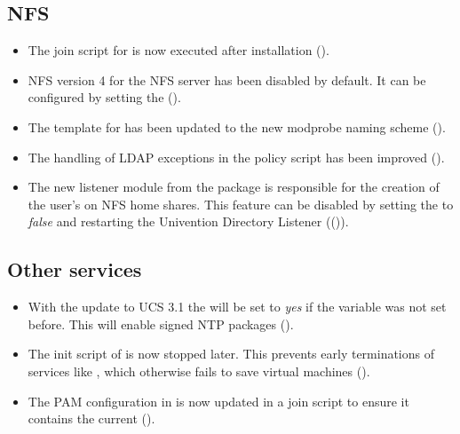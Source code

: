 \subsection{NFS}
\begin{itemize}
\item The join script for  is now
  executed after installation ().

\item NFS version 4 for the NFS server has been disabled by
  default. It can be configured by setting the
   ().

\item The \ucsUCR{} template for
   has been updated to the
  new modprobe naming scheme ().

\item The handling of LDAP exceptions in the policy script
   has been improved ().

\item The new listener module  from the package
   is responsible for the creation of
  the user's  on NFS home shares. This feature can be
  disabled by setting the  to
  \emph{false} and restarting the Univention Directory Listener
  (()).
\end{itemize}


\subsection{Other services}
\begin{itemize}
\item With the update to UCS 3.1 the  will be set
  to \emph{yes} if the variable was not set before. This will enable signed
  NTP packages ().

\item The init script of  is now stopped later. This
  prevents early terminations of services like ,
  which otherwise fails to save virtual machines ().

\item The PAM configuration in  is now
  updated in a join script to ensure it contains the current
   ().
\end{itemize}


